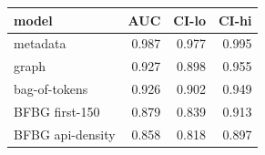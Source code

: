 \begin{tabular}{lrrr}
\toprule
model & AUC & CI-lo & CI-hi \\
\midrule
metadata & 0.987 & 0.977 & 0.995 \\
graph & 0.927 & 0.898 & 0.955 \\
bag-of-tokens & 0.926 & 0.902 & 0.949 \\
BFBG first-150 & 0.879 & 0.839 & 0.913 \\
BFBG api-density & 0.858 & 0.818 & 0.897 \\
\bottomrule
\end{tabular}
